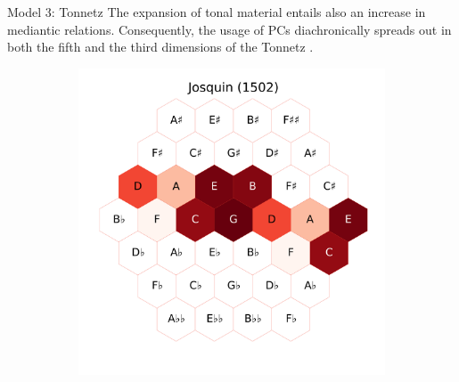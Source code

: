 \documentclass[final,cmyk]{beamer}
\begin{document}
\begin{frame}[t]
\begin{minipage}[t][.68\textheight][t]{\textwidth}
\begin{columns}[t]
    \begin{column}{0.3\textwidth}

			\begin{block}{Model 3: Tonnetz}
				The expansion of tonal material entails also an increase in mediantic relations.
				Consequently, the usage of PCs diachronically spreads out in both the fifth
				and the third dimensions of the Tonnetz \autocite{Cohn2012}.

				\begin{figure}
				\centering
				\begin{subfigure}{\textwidth} %
					\includegraphics[width=\textwidth]{img/josquin_tonnetz.png}
				\end{subfigure}
				\begin{subfigure}{\textwidth} %

\end{subfigure}
\end{figure}
\end{block}
\end{column}
\end{columns}
\end{minipage}
\end{frame}
\end{document}
